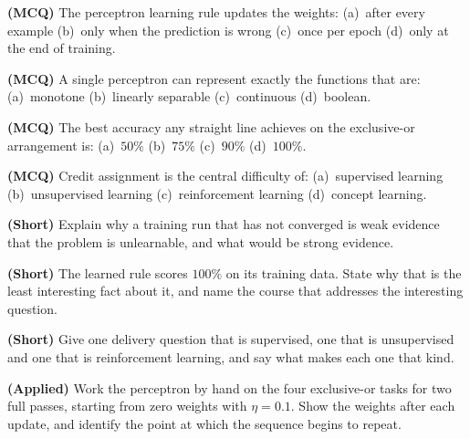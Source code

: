 \begin{reviewq}
  \item \textbf{(MCQ)} The perceptron learning rule updates the weights:
        (a)~after every example (b)~only when the prediction is wrong
        (c)~once per epoch (d)~only at the end of training.
  \item \textbf{(MCQ)} A single perceptron can represent exactly the functions that
        are: (a)~monotone (b)~linearly separable (c)~continuous (d)~boolean.
  \item \textbf{(MCQ)} The best accuracy any straight line achieves on the
        exclusive-or arrangement is: (a)~$50\%$ (b)~$75\%$ (c)~$90\%$ (d)~$100\%$.
  \item \textbf{(MCQ)} Credit assignment is the central difficulty of:
        (a)~supervised learning (b)~unsupervised learning (c)~reinforcement
        learning (d)~concept learning.
  \item \textbf{(Short)} Explain why a training run that has not converged is weak
        evidence that the problem is unlearnable, and what would be strong evidence.
  \item \textbf{(Short)} The learned rule scores $100\%$ on its training data. State
        why that is the least interesting fact about it, and name the course that
        addresses the interesting question.
  \item \textbf{(Short)} Give one delivery question that is supervised, one that is
        unsupervised and one that is reinforcement learning, and say what makes each
        one that kind.
  \item \textbf{(Applied)} Work the perceptron by hand on the four exclusive-or
        tasks for two full passes, starting from zero weights with $\eta = 0.1$.
        Show the weights after each update, and identify the point at which the
        sequence begins to repeat.
\end{reviewq}
